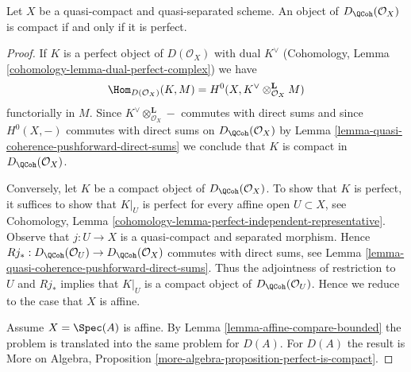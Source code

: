 \begin{proposition}
\label{proposition-compact-is-perfect}
Let $X$ be a quasi-compact and quasi-separated scheme.
An object of $D_\QCoh(\mathcal{O}_X)$ is compact
if and only if it is perfect.
\end{proposition}

\begin{proof}
If $K$ is a perfect object of $D(\mathcal{O}_X)$ with dual
$K^\vee$ (Cohomology, Lemma \ref{cohomology-lemma-dual-perfect-complex})
we have
$$
\Hom_{D(\mathcal{O}_X)}(K, M) =
H^0(X, K^\vee \otimes_{\mathcal{O}_X}^\mathbf{L} M)
$$
functorially in $M$. Since $K^\vee \otimes_{\mathcal{O}_X}^\mathbf{L} -$
commutes with direct sums and since $H^0(X, -)$ commutes with direct
sums on $D_\QCoh(\mathcal{O}_X)$ by
Lemma \ref{lemma-quasi-coherence-pushforward-direct-sums}
we conclude that $K$ is compact in $D_\QCoh(\mathcal{O}_X)$.

\medskip\noindent
Conversely, let $K$ be a compact object of $D_\QCoh(\mathcal{O}_X)$.
To show that $K$ is perfect, it suffices to show that
$K|_U$ is perfect for every affine open $U \subset X$, see
Cohomology, Lemma \ref{cohomology-lemma-perfect-independent-representative}.
Observe that $j : U \to X$ is a quasi-compact and separated morphism.
Hence
$Rj_* : D_\QCoh(\mathcal{O}_U) \to D_\QCoh(\mathcal{O}_X)$
commutes with direct sums, see
Lemma \ref{lemma-quasi-coherence-pushforward-direct-sums}.
Thus the adjointness of restriction to $U$ and $Rj_*$ implies that
$K|_U$ is a compact object of $D_\QCoh(\mathcal{O}_U)$.
Hence we reduce to the case that $X$ is affine.

\medskip\noindent
Assume $X = \Spec(A)$ is affine. By Lemma \ref{lemma-affine-compare-bounded}
the problem is translated into the same problem for $D(A)$.
For $D(A)$ the result is
More on Algebra, Proposition \ref{more-algebra-proposition-perfect-is-compact}.
\end{proof}
